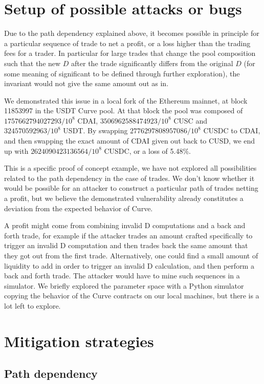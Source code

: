 \documentclass{article}
\begin{document}
{{{{    \section{Setup of possible attacks or bugs}

    Due to the path dependency explained above, it becomes possible in principle for a particular sequence of trade to net a profit, or a loss higher than the trading fees for a trader. In particular for large trades that change the pool composition such that the new $D$ after the trade significantly differs from the original $D$ (for some meaning of significant to be defined through further exploration), the invariant would not give the same amount out as in. 
    
    We demonstrated this issue in a local fork of the Ethereum mainnet, at block 11853997 in the USDT Curve pool. At that block the pool was composed of $1757662794027293/10^{8}$ CDAI, $3506962588474923/10^{8}$ CUSC and $324570592963/10^{8}$ USDT. By swapping $2776297808957086/10^{8}$ CUSDC to CDAI, and then swapping the exact amount of CDAI given out back to CUSD, we end up with $2624090423136564/10^{8}$ CUSDC, or a loss of 5.48\%. 

    This is a specific proof of concept example, we have not explored all possibilities related to the path dependency in the case of trades. We don't know whether it would be possible for an attacker to construct a particular path of trades netting a profit, but we believe the demonstrated vulnerability already constitutes a deviation from the expected behavior of Curve. 

    A profit might come from combining invalid D computations and a back and forth trade, for example if the attacker trades an amount crafted specifically to trigger an invalid D computation and then trades back the same amount that they got out from the first trade. Alternatively, one could find a small amount of liquidity to add in order to trigger an invalid D calculation, and then perform a back and forth trade. The attacker would have to mine such sequences in a simulator. We briefly explored the parameter space with a Python simulator copying the behavior of the Curve contracts on our local machines, but there is a lot left to explore. 

    \section{Mitigation strategies}

    \subsection{Path dependency}

}}}}
\end{document}
